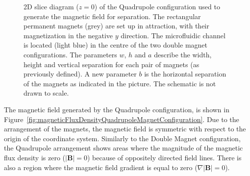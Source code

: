 \begin{figure}[htb]
\centering
{}
\caption[2D diagram of the Quadrupole configuration]{2D slice diagram ($z=0$) of the Quadrupole configuration used to generate the magnetic field for separation. The rectangular permanent magnets (grey) are set up in attraction, with their magnetization in the negative $y$ direction. The microfluidic channel is located (light blue) in the centre of the two double magnet configurations. The parameters $w$, $h$ and $a$ describe the width, height and vertical separation for each pair of magnets (as previously defined). A new parameter $b$ is the horizontal separation of the magnets as indicated in the picture. The schematic is not drawn to scale.}%
\label{fig:quadrupoleMagnetConfiguration}
\end{figure}

The magnetic field generated by the Quadrupole configuration, is shown in Figure~\ref{fig:magneticFluxDensityQuadrupoleMagnetConfiguration}. Due to the arrangement of the magnets, the magnetic field is symmetric with respect to the origin of the coordinate system. Similarly to the Double Magnet configuration, the Quadrupole arrangement shows areas where the magnitude of the magnetic flux density is zero ($|\mathbf{B}|=0$) because of oppositely directed field lines. There is also a region where the magnetic field gradient is equal to zero ($\nabla|\mathbf{B}|=0$).

